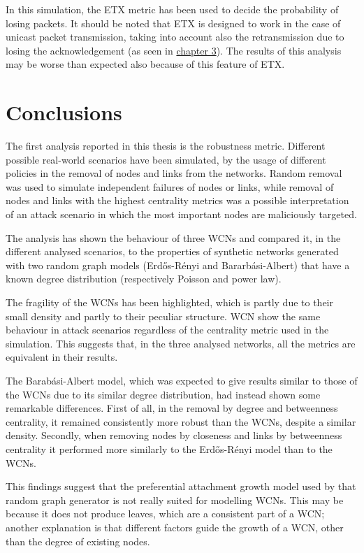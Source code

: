 \documentclass[a4paper,11pt,twoside,openright]{memoir}
\begin{document}
In this simulation, the ETX metric has been used to decide the probability of
losing packets. It should be noted that ETX is designed to work in the case
of unicast packet transmission, taking into account also the retransmission due to
losing the acknowledgement (as seen in \hyperref[olsr-survey]{chapter 3}).
The results of this analysis may be worse
than expected also because of this feature of ETX.

\chapter{Conclusions}\label{conclusions}

The first analysis reported in this thesis is the robustness metric.
Different possible real-world scenarios have been simulated, by the usage
of different policies in the removal of nodes and links from the networks.
Random removal was used to simulate independent failures of nodes or links,
while removal of nodes and links with the highest centrality metrics was a
possible interpretation of an attack scenario in which the most important
nodes are maliciously targeted.

The analysis has shown the behaviour of three WCNs and compared it, in the
different analysed scenarios, to the properties of synthetic networks
generated with two random graph models (Erd\H{o}s-Rényi and Bararbási-Albert)
that have a known degree distribution (respectively Poisson and power law).

The fragility of the WCNs has been highlighted, which is partly due
to their small density and partly to their peculiar structure. WCN show the
same behaviour in attack scenarios regardless of the centrality metric used
in the simulation. This suggests that, in the three analysed
networks, all the metrics are equivalent in their results.

The Barabási-Albert model, which was expected to give results similar to
those of the WCNs due to its similar degree distribution, had instead shown
some remarkable differences. First of all, in the removal by degree and
betweenness centrality, it remained consistently more robust than the WCNs,
despite a similar density. Secondly, when removing nodes by closeness and
links by betweenness centrality it performed more similarly to the
Erd\H{o}s-Rényi model than to the WCNs.

This findings suggest that the preferential attachment growth model used by
that random graph generator is not really suited for modelling WCNs.
This may be because it does not produce leaves, which are a consistent part
of a WCN; another explanation is that different factors guide the growth of
a WCN, other than the degree of existing nodes.
\end{document}
